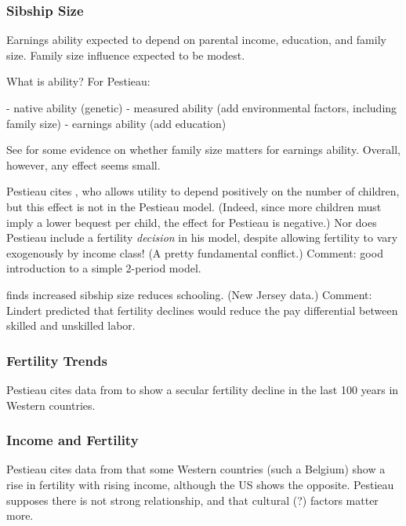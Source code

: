 \documentclass{article}
\begin{document}
\subsubsection{Sibship Size}

Earnings ability expected to depend on
parental income,
education,
and family size.
Family size influence expected to be modest.

What is ability?  For Pestieau:

- native ability (genetic)
- measured ability (add environmental factors, including family size)
- earnings ability (add education)

See \citet[Table 1]{pestieau-1984-oep} for some evidence
on whether family size matters for earnings ability.
Overall, however, any effect seems small.

Pestieau cites \citet{cigno-1983-oep},
who allows utility to depend positively on the number of children,
but this effect is not in the Pestieau model.
(Indeed, since more children must imply a lower bequest per child,
the effect for Pestieau is negative.)
Nor does Pestieau include a fertility \emph{decision} in his model,
despite allowing fertility to vary exogenously by income class!
(A pretty fundamental conflict.)
Comment: good introduction to a simple 2-period model.

\citet{lindert-1977-jhr} finds increased sibship size reduces schooling.
(New Jersey data.)
Comment: Lindert predicted that fertility declines would reduce the
pay differential between skilled and unskilled labor.



\subsubsection{Fertility Trends}

Pestieau cites data from \citet{festy-1979-ined} to show a secular fertility decline in the last 100 years in Western countries.

\subsubsection{Income and Fertility}

Pestieau cites data from \citet{un-1976-fertility} that some Western countries (such a Belgium) show a rise in fertility with rising income, although the US shows the opposite.
Pestieau supposes there is not strong relationship,
and that cultural (?) factors matter more.
\end{document}
